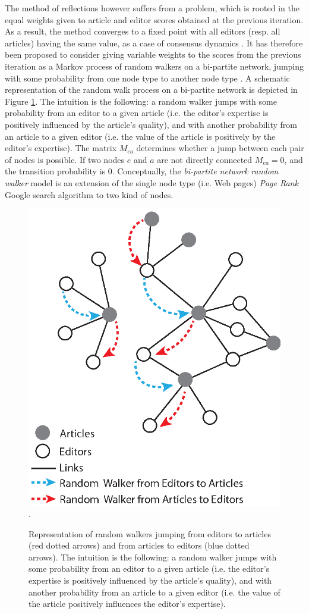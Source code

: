 The method of reflections however suffers from a problem, which is rooted in the equal weights given to article and editor scores obtained at the previous iteration. As a result, the method converges to a fixed point with all editors (resp. all articles) having the same value, as a case of consensus dynamics \cite{caldarelli2012network}. It has therefore been proposed to consider giving variable weights to the scores from the previous iteration as a Markov process of random walkers on a bi-partite network, jumping with some probability from one node type to another node type \cite{caldarelli2012network}. A schematic representation of the random walk process on a bi-partite network is depicted in Figure \ref{fig:jumpers}. The intuition is the following: a random walker jumps with some probability from an editor to a given article (i.e. the editor's expertise is positively influenced by the article's quality), and with another probability from an article to a given editor (i.e. the value of the article is positively by the editor's expertise). The matrix $M_{ea}$ determines whether a jump between each pair of nodes is possible. If two nodes $e$ and $a$ are not directly connected $M_{ea} = 0$, and the transition probability is 0. Conceptually, the {\it bi-partite network random walker} model is an extension of the single node type (i.e. Web pages) {\it Page Rank} Google search algorithm \cite{page1999pagerank} to two kind of nodes.

\begin{figure}[!t]
\centering
\includegraphics[width=0.7\columnwidth]{../Figures/bi-partite_net.eps}.
\caption{Representation of random walkers jumping from editors to articles (red dotted arrows) and from articles to editors (blue dotted arrows). The intuition is the following: a random walker jumps with some probability from an editor to a given article (i.e. the editor's expertise is positively influenced by the article's quality), and with another probability from an article to a given editor (i.e. the value of the article positively influences the editor's expertise).}
\label{fig:jumpers}
\end{figure}


